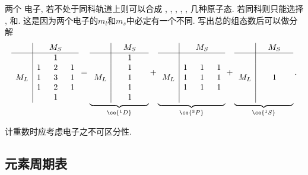 \documentclass[hidelinks]{ctexart}
\begin{document}
两个 电子, 若不处于同科轨道上则可以合成 , , , , , 几种原子态. 若同科则只能选择 , 和. 这是因为两个电子的$m_l$和$m_s$中必定有一个不同. 写出总的组态数后可以做分解
\[ \begin{array}{c|ccc}
    &   & M_S & \\
    \hline
    &   & 1   & \\
    & 1 & 2   & 1\\
M_L & 1 & 3   & 1\\
    & 1 & 2   & 1\\
    &   & 1   &
\end{array} = \underbrace{\begin{array}{c|ccc}
    &   & M_S & \\
    \hline
    &   & 1   & \\
    &   & 1   & \\
M_L &   & 1   & \\
    &   & 1   & \\
    &   & 1   &
\end{array}}_{\ce{^1D}} + \underbrace{\begin{array}{c|ccc}
    &   & M_S & \\
    \hline
    &   &     & \\
    & 1 & 1   & 1 \\
M_L & 1 & 1   & 1 \\
    & 1 & 1   & 1 \\
    &   &     &
\end{array}}_{\ce{^3P}} + \underbrace{\begin{array}{c|ccc}
    &   & M_S & \\
    \hline
    &   &     & \\
    &   &     &   \\
M_L &   & 1   &   \\
    &   &     &   \\
    &   &     &
\end{array}}_{\ce{^1S}}. \]
\begin{pitfall}
    计重数时应考虑电子之不可区分性.
\end{pitfall}



\subsection{元素周期表} %
\label{sub:元素周期表}
\end{document}
